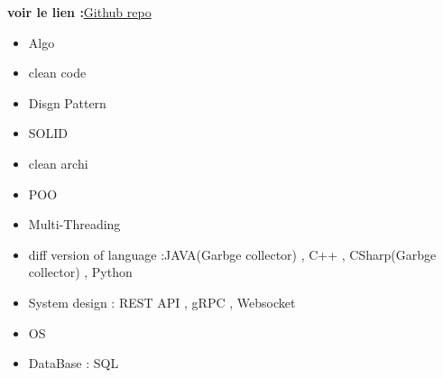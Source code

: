 \textbf{voir le lien :}\href{https://github.com/mohameml/Algo/tree/main}{Github repo}

\begin{itemize}
    \item Algo 
    \item clean code 
    \item Disgn Pattern 
    \item SOLID 
    \item clean archi 
    \item POO 
    \item Multi-Threading 
    \item diff version of language :JAVA(Garbge collector) , C++ , CSharp(Garbge collector) , Python 
    \item System design : REST API , gRPC , Websocket
    \item OS 
    \item DataBase : SQL 
\end{itemize}


